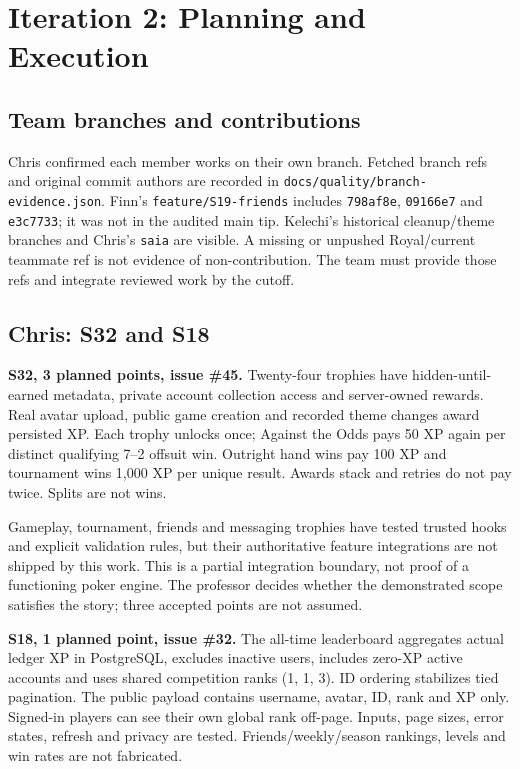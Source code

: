 \documentclass[11pt,a4paper]{article}
\begin{document}
\section{Iteration 2: Planning and Execution}
\subsection{Team branches and contributions}
Chris confirmed each member works on their own branch. Fetched branch refs and original commit authors are recorded in \texttt{docs/quality/branch-evidence.json}. Finn's \texttt{feature/S19-friends} includes \texttt{798af8e}, \texttt{09166e7} and \texttt{e3c7733}; it was not in the audited main tip. Kelechi's historical cleanup/theme branches and Chris's \texttt{saia} are visible. A missing or unpushed Royal/current teammate ref is not evidence of non-contribution. The team must provide those refs and integrate reviewed work by the cutoff.

\subsection{Chris: S32 and S18}
\textbf{S32, 3 planned points, issue \#45.} Twenty-four trophies have hidden-until-earned metadata, private account collection access and server-owned rewards. Real avatar upload, public game creation and recorded theme changes award persisted XP. Each trophy unlocks once; Against the Odds pays 50 XP again per distinct qualifying 7--2 offsuit win. Outright hand wins pay 100 XP and tournament wins 1,000 XP per unique result. Awards stack and retries do not pay twice. Splits are not wins.

Gameplay, tournament, friends and messaging trophies have tested trusted hooks and explicit validation rules, but their authoritative feature integrations are not shipped by this work. This is a partial integration boundary, not proof of a functioning poker engine. The professor decides whether the demonstrated scope satisfies the story; three accepted points are not assumed.

\textbf{S18, 1 planned point, issue \#32.} The all-time leaderboard aggregates actual ledger XP in PostgreSQL, excludes inactive users, includes zero-XP active accounts and uses shared competition ranks (1, 1, 3). ID ordering stabilizes tied pagination. The public payload contains username, avatar, ID, rank and XP only. Signed-in players can see their own global rank off-page. Inputs, page sizes, error states, refresh and privacy are tested. Friends/weekly/season rankings, levels and win rates are not fabricated.
\end{document}
